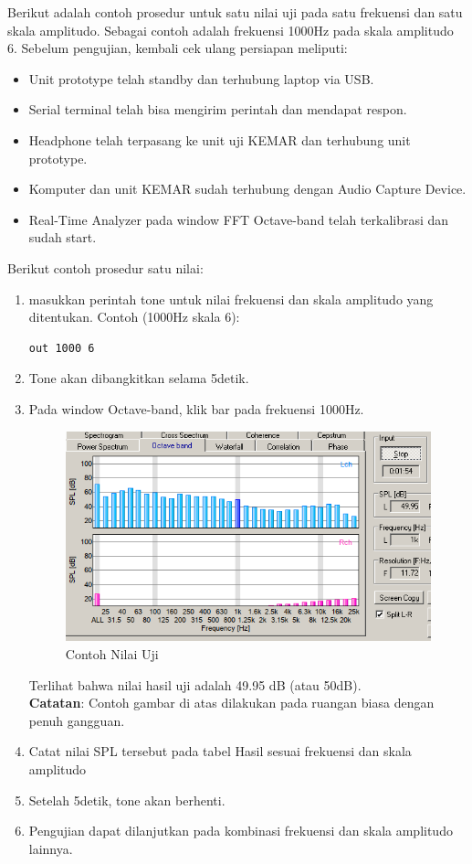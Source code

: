 \documentclass[12pt,]{article}
\begin{document}
	Berikut adalah contoh prosedur untuk satu nilai uji pada satu frekuensi dan satu skala amplitudo.
	Sebagai contoh adalah frekuensi 1000Hz pada skala amplitudo 6.
	Sebelum pengujian, kembali cek ulang persiapan meliputi:
	\begin{itemize}
		\item Unit prototype telah standby dan terhubung laptop via USB.
		\item Serial terminal telah bisa mengirim perintah dan mendapat respon.
		\item Headphone telah terpasang ke unit uji KEMAR dan terhubung unit prototype.
		\item Komputer dan unit KEMAR sudah terhubung dengan Audio Capture Device.
		\item Real-Time Analyzer pada window FFT Octave-band telah terkalibrasi dan sudah start.
	\end{itemize}

	Berikut contoh prosedur satu nilai:
	\begin{enumerate}
		\item masukkan perintah tone untuk nilai frekuensi dan skala amplitudo yang ditentukan.
		Contoh (1000Hz skala 6):
		\begin{verbatim}
out 1000 6
		\end{verbatim}
		
		\item Tone akan dibangkitkan selama 5detik.
		
		\item Pada window Octave-band, klik bar pada frekuensi 1000Hz.
		
			\begin{figure}[!ht]
			\centering
			\includegraphics[width=300pt]{images/terminal/contoh}
			\caption{Contoh Nilai Uji}
		\end{figure}
	
		Terlihat bahwa nilai hasil uji adalah 49.95 dB (atau 50dB).\\
		\textbf{Catatan}: Contoh gambar di atas dilakukan pada ruangan biasa dengan penuh gangguan.
		
		\item Catat nilai SPL tersebut pada tabel Hasil sesuai frekuensi dan skala amplitudo
		
		\item Setelah 5detik, tone akan berhenti.
		
		\item Pengujian dapat dilanjutkan pada kombinasi frekuensi dan skala amplitudo lainnya.
	\end{enumerate}
	
\end{document}
